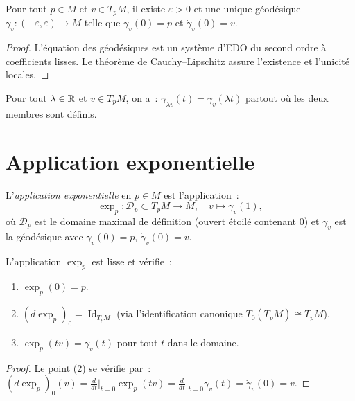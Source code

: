 \begin{theoreme}
Pour tout $p \in M$ et $v \in T_pM$, il existe $\varepsilon > 0$ et une unique
g\'eod\'esique $\gamma_v : (-\varepsilon, \varepsilon) \to M$ telle que
$\gamma_v(0) = p$ et $\dot\gamma_v(0) = v$.
\end{theoreme}

\begin{proof}
L'\'equation des g\'eod\'esiques est un syst\`eme d'EDO du second ordre \`a coefficients
lisses. Le th\'eor\`eme de Cauchy--Lipschitz assure l'existence et l'unicit\'e locales.
\end{proof}

\begin{proposition}
Pour tout $\lambda \in \mathbb{R}$ et $v \in T_pM$, on a~:
$\gamma_{\lambda v}(t) = \gamma_v(\lambda t)$
partout o\`u les deux membres sont d\'efinis.
\end{proposition}

\section{Application exponentielle}

\begin{definition}
L'\emph{application exponentielle} en $p \in M$ est l'application~:
\[
    \exp_p : \mathcal{D}_p \subset T_pM \to M, \quad v \mapsto \gamma_v(1),
\]
o\`u $\mathcal{D}_p$ est le domaine maximal de d\'efinition (ouvert \'etoil\'e contenant
$0$) et $\gamma_v$ est la g\'eod\'esique avec $\gamma_v(0) = p$, $\dot\gamma_v(0) = v$.
\end{definition}

\begin{proposition}
L'application $\exp_p$ est lisse et v\'erifie~:
\begin{enumerate}
    \item $\exp_p(0) = p$.
    \item $(d\exp_p)_0 = \operatorname{Id}_{T_pM}$ (via l'identification canonique
          $T_0(T_pM) \cong T_pM$).
    \item $\exp_p(tv) = \gamma_v(t)$ pour tout $t$ dans le domaine.
\end{enumerate}
\end{proposition}

\begin{proof}
Le point (2) se v\'erifie par~: $(d\exp_p)_0(v) = \frac{d}{dt}\Big|_{t=0} \exp_p(tv)
= \frac{d}{dt}\Big|_{t=0} \gamma_v(t) = \dot\gamma_v(0) = v$.
\end{proof}

